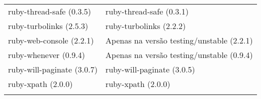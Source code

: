 \begin{anexosenv}
\begin{longtable}[H]{l|l}
        ruby-thread-safe (0.3.5)                         & ruby-thread-safe (0.3.1)                                  \\
        ruby-turbolinks (2.5.3)                          & ruby-turbolinks (2.2.2)                                  \\
        ruby-web-console (2.2.1)                         & Apenas na versão testing/unstable (2.2.1)                                  \\
        ruby-whenever (0.9.4)                            & Apenas na versão testing/unstable (0.9.4)                                  \\
        ruby-will-paginate (3.0.7)                       & ruby-will-paginate (3.0.5)                                  \\
        ruby-xpath (2.0.0)                               & ruby-xpath (2.0.0)                                  \\
        \hline
				\label{tabela1}
\end{longtable}



\end{anexosenv}
